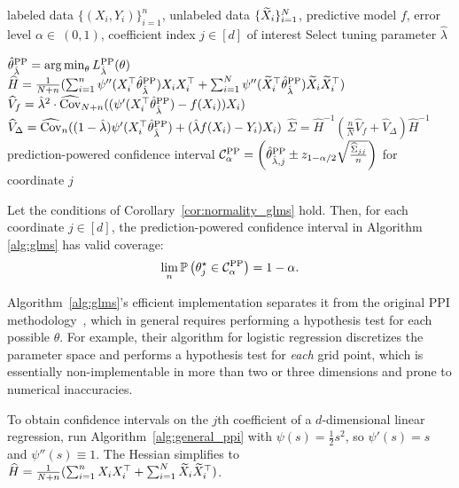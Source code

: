 \begin{algorithm}[t]
\caption{\ppipp: Prediction-powered inference for GLMs}
\label{alg:glms}
\begin{algorithmic}[1]
  \Require labeled data $\{(X_i, Y_i)\}_{i=1}^n$, unlabeled data $\{\widetilde X_i\}_{i=1}^N$, predictive model $f$, error level $\alpha\in~(0,1)$, coefficient index
  $j \in [d]$ of interest
  \State Select tuning parameter $\hat\lambda$

  \State $\hat{\theta}^{\mathrm{PP}}_{\hat\lambda} = \operatorname*{arg\,min}_\theta L^{\mathrm{PP}}_{\hat\lambda}(\theta)$ 
    \State $\widehat H = \frac{1}{N+n} (\sum_{i=1}^n \psi''(X_i^\top \hat{\theta}^{\mathrm{PP}}_{\hat\lambda}) X_iX_i^\top + \sum_{i=1}^N \psi''(\widetilde X_i^\top \hat{\theta}^{\mathrm{PP}}_{\hat\lambda}) \widetilde X_i \widetilde X_i^\top)$
\State $\widehat V_f = \hat\lambda^2 \cdot \widehat{\mathrm{Cov}}_{N+n} (  (\psi'(X_i^\top \hat{\theta}^{\mathrm{PP}}_{\hat\lambda})-f(X_i)) X_i)$ 
\State $\widehat V_\Delta = \widehat{\mathrm{Cov}}_{n} ( (1-\hat \lambda)\psi'(X_i^\top\hat{\theta}^{\mathrm{PP}}_{\hat\lambda}) + (\hat\lambda f(X_i) -Y_i)X_i)$ 
\State $\widehat\Sigma = \widehat H^{-1}( \frac{n}{N} \widehat V_f + \widehat V_\Delta) \widehat H^{-1}$ 
\Ensure 
prediction-powered confidence interval $\mathcal{C}^{\mathrm{PP}}_\alpha = \left(\hat{\theta}^{\mathrm{PP}}_{\hat\lambda, j} \pm z_{1-\alpha/2} \sqrt{\frac{\widehat\Sigma_{jj}}{n}} \right)$
for coordinate $j$
\end{algorithmic}
\end{algorithm}



\begin{corollary}
  Let the conditions of Corollary~\ref{cor:normality_glms} hold.  Then, for
  each coordinate $j \in [d]$, the prediction-powered confidence interval in
  Algorithm \ref{alg:glms} has valid coverage:
  \[\lim_{n} \mathbb{P}\left(\theta^\star_{j} \in \mathcal{C}^{\mathrm{PP}}_\alpha \right) = 1-\alpha.\]
\end{corollary}

Algorithm~\ref{alg:glms}'s efficient implementation separates
it from the original PPI methodology~\cite{AngelopoulosBaFaJoZr23}, which in general
requires performing a hypothesis test for each possible $\theta$. For
example, their algorithm for logistic regression discretizes the parameter space
and performs a hypothesis test for \emph{each} grid point, which is
essentially non-implementable in more than two
or three dimensions and prone to numerical inaccuracies.

\begin{example}
  To obtain confidence intervals on the $j$th coefficient of a
  $d$-dimensional linear regression, run Algorithm~\ref{alg:general_ppi}
  with $\psi(s) = \frac{1}{2}s^2$, so $\psi'(s) = s$ and
  $\psi''(s) \equiv 1$.
  The Hessian  simplifies to $\widehat H = \frac{1}{N+n} (
  \sum_{i=1}^n X_i X_i^\top + \sum_{i=1}^N \widetilde{X}_i\widetilde{X}_i^\top )$.
\end{example}

